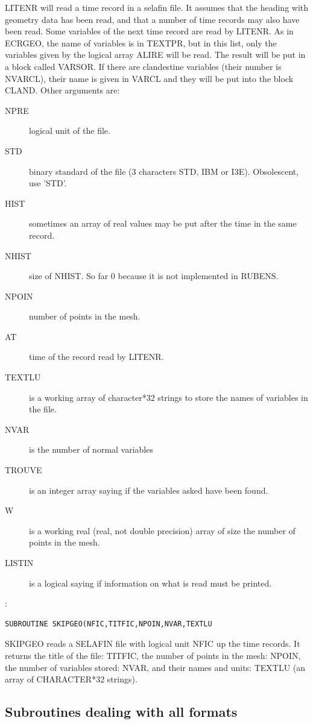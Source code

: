 LITENR will read a time record in a selafin file. It assumes that the heading
with geometry data has been read, and that a number of time records may also
have been read. Some variables of the next time record are read by LITENR. As
in ECRGEO, the name of variables is in TEXTPR, but in this list, only the
variables given by the logical array ALIRE will be read. The result will be put
in a block called VARSOR. If there are clandestine variables (their number is
NVARCL), their name is given in VARCL and they will be put into the block
CLAND. Other arguments are:
\begin{description}
  \item [NPRE] logical unit of the file.
  \item [STD] binary standard of the file (3 characters STD, IBM or I3E).
    Obsolescent, use 'STD'.
  \item [HIST] sometimes an array of real values may be put after the time in
    the same record.
  \item [NHIST] size of NHIST. So far 0 because it is not implemented in
    RUBENS.
  \item [NPOIN] number of points in the mesh.
  \item [AT] time of the record read by LITENR.
  \item [TEXTLU] is a working array of character*32 strings to store the names
    of variables in the file.
  \item [NVAR] is the number of normal variables
  \item [TROUVE] is an integer array saying if the variables asked have been
    found.
  \item [W] is a working real (real, not double precision) array of size the
    number of points in the mesh.
  \item [LISTIN] is a logical saying if information on what is read must be
    printed.
\end{description}

:
\begin{lstlisting}[language=TelFortran]
SUBROUTINE SKIPGEO(NFIC,TITFIC,NPOIN,NVAR,TEXTLU
\end{lstlisting}

SKIPGEO reads a SELAFIN file with logical unit NFIC up the time records. It
returns the title of the file: TITFIC, the number of points in the mesh: NPOIN,
the number of variables stored: NVAR, and their names and units: TEXTLU (an
array of CHARACTER*32 strings).

\subsection{Subroutines dealing with all formats}

